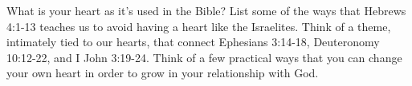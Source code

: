 \begin{questions}
\q What is your heart as it's used in the Bible?
\q List some of the ways that Hebrews 4:1-13 teaches us to avoid having a heart like the Israelites.
\q Think of a theme, intimately tied to our hearts, that connect Ephesians 3:14-18, Deuteronomy 10:12-22, and I John 3:19-24.
\q Think of a few practical ways that you can change your own heart in order to grow in your relationship with God.
\end{questions}